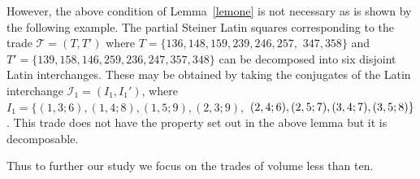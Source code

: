 \documentclass[12pt]{report}
\begin{document}
However, the above condition of Lemma~\ref{lemone} is not necessary as 
is shown by the following example. The partial Steiner  Latin squares
corresponding to the trade ${\mathcal T}=(T,T')$ 
where $T=\{136,148,159,239,246,257,$ $347,358\}$ and
$T'=\{139,158,146,259,
236,247,357,348\}$ can be decomposed into six disjoint 
Latin interchanges. These may be obtained by taking the conjugates of the 
Latin interchange ${\mathcal I}_1=(I_1,I_1')$, where 
$I_1=\{(1,3;6),(1,4;8),(1,5;9),(2,3;9),$
$(2,4;6),(2,5;7),(3,4;7),\break (3,5;8)\}$.
This trade does not have the property set out in the above lemma but
it is decomposable.

Thus to further our study we focus on the trades of volume less than 
ten.
\vspace{.5cm}
%
%
%
%
%
%
%
%
%
%
\end{document}
